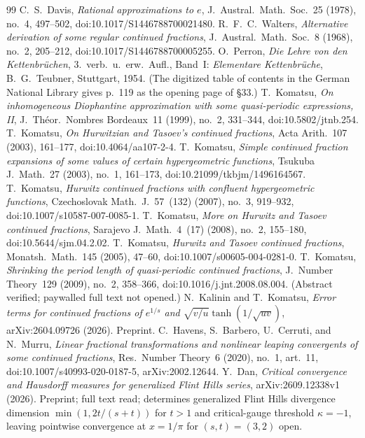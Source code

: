 \documentclass[11pt]{amsart}
\theoremstyle{definition}
\theoremstyle{remark}
\numberwithin{equation}{section}
\begin{document}
\begin{thebibliography}{99}
 C.~S.~Davis, \emph{Rational approximations to $e$}, J.~Austral.~Math.~Soc.~25 (1978), no.~4, 497--502, doi:10.1017/S1446788700021480.
 R.~F.~C.~Walters, \emph{Alternative derivation of some regular continued fractions}, J.~Austral.~Math.~Soc.~8 (1968), no.~2, 205--212, doi:10.1017/S1446788700005255.
 O.~Perron, \emph{Die Lehre von den Kettenbr\"uchen}, 3.~verb.~u.~erw.~Aufl., Band~I: \emph{Elementare Kettenbr\"uche}, B.~G.~Teubner, Stuttgart, 1954. (The digitized table of contents in the German National Library gives p.~119 as the opening page of \S33.)
 T.~Komatsu, \emph{On inhomogeneous Diophantine approximation with some quasi-periodic expressions, II}, J.~Th\'eor.~Nombres Bordeaux~11 (1999), no.~2, 331--344, doi:10.5802/jtnb.254.
 T.~Komatsu, \emph{On Hurwitzian and Tasoev's continued fractions}, Acta Arith.~107 (2003), 161--177, doi:10.4064/aa107-2-4.
 T.~Komatsu, \emph{Simple continued fraction expansions of some values of certain hypergeometric functions}, Tsukuba J.~Math.~27 (2003), no.~1, 161--173, doi:10.21099/tkbjm/1496164567.
 T.~Komatsu, \emph{Hurwitz continued fractions with confluent hypergeometric functions}, Czechoslovak Math.~J.~57~(132) (2007), no.~3, 919--932, doi:10.1007/s10587-007-0085-1.
 T.~Komatsu, \emph{More on Hurwitz and Tasoev continued fractions}, Sarajevo J.~Math.~4~(17) (2008), no.~2, 155--180, doi:10.5644/sjm.04.2.02.
 T.~Komatsu, \emph{Hurwitz and Tasoev continued fractions}, Monatsh.\ Math.~145 (2005), 47--60, doi:10.1007/s00605-004-0281-0.
 T.~Komatsu, \emph{Shrinking the period length of quasi-periodic continued fractions}, J.~Number Theory~129 (2009), no.~2, 358--366, doi:10.1016/j.jnt.2008.08.004. (Abstract verified; paywalled full text not opened.)
 N.~Kalinin and T.~Komatsu, \emph{Error terms for continued fractions of $e^{1/s}$ and $\sqrt{v/u}\tanh(1/\sqrt{uv})$}, arXiv:2604.09726 (2026). Preprint.
 C.~Havens, S.~Barbero, U.~Cerruti, and N.~Murru, \emph{Linear fractional transformations and nonlinear leaping convergents of some continued fractions}, Res.~Number Theory~6 (2020), no.~1, art.~11, doi:10.1007/s40993-020-0187-5, arXiv:2002.12644.
 Y.~Dan, \emph{Critical convergence and Hausdorff measures for generalized Flint Hills series}, arXiv:2609.12338v1 (2026). Preprint; full text read; determines generalized Flint Hills divergence dimension $\min(1,2t/(s+t))$ for $t>1$ and critical-gauge threshold $\kappa=-1$, leaving pointwise convergence at $x=1/\pi$ for $(s,t)=(3,2)$ open.

\end{thebibliography}
\end{document}
